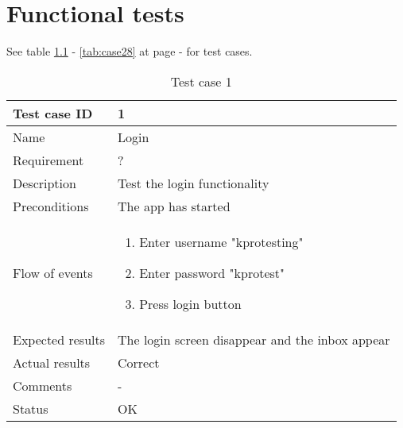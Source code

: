 \chapter{Functional tests}
		See table \ref{tab:case1} - \ref{tab:case28} at page \pageref{tab:case1} - \pageref{tab:case28} for test cases.
		\begin{table}[h!]
			\begin{tabular}{l|p{10cm}}
				Test case ID & 1 \\ \hline
				Name & Login\\ \hline
				Requirement & ? \\ \hline
				Description & Test the login functionality\\ \hline
				Preconditions & The app has started\\ \hline
				Flow of events & 
					\begin{enumerate}
						\item{}Enter username "kprotesting"
						\item{}Enter password "kprotest"
						\item{}Press login button
					\end{enumerate} \\ \hline
				Expected results & The login screen disappear and the inbox appear\\ \hline
				Actual results & Correct\\ \hline
				Comments & -\\ \hline
				Status & OK\\ \hline
			\end{tabular}
			\caption{Test case 1} \label{tab:case1}
		\end{table}

